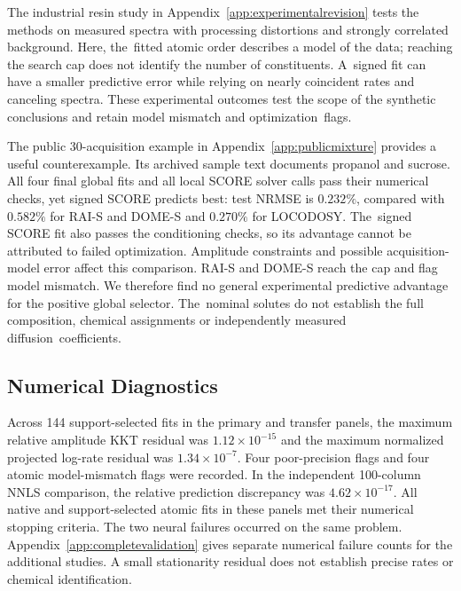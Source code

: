 \documentclass[mathematics,article,accept,moreauthors]{Definitions/mdpi}
\begin{document}
The industrial resin study in Appendix~\ref{app:experimentalrevision} tests the
methods on measured spectra with processing distortions and strongly correlated
background. Here, the~fitted atomic order describes a model of the data; reaching
the search cap does not identify the number of constituents. A~signed fit can
have a smaller predictive error while relying on nearly coincident rates and
canceling spectra. These experimental outcomes test the scope of the synthetic
conclusions and retain model mismatch and optimization~flags.

The public 30-acquisition example in Appendix~\ref{app:publicmixture} provides
a useful counterexample. Its archived sample text documents propanol and sucrose.
All four final global fits and all local SCORE solver calls pass their numerical
checks, yet signed SCORE predicts best: test NRMSE is $0.232\%$, compared with
$0.582\%$ for RAI-S and DOME-S and $0.270\%$ for LOCODOSY. The~signed SCORE fit
also passes the conditioning checks, so its advantage cannot be attributed to
failed optimization. Amplitude constraints and possible acquisition-model error
affect this comparison. RAI-S and DOME-S reach the cap and flag model mismatch.
We therefore find no general experimental predictive advantage for the positive
global selector. The~nominal solutes do not establish the full composition,
chemical assignments or independently measured diffusion~coefficients.

\subsection{Numerical Diagnostics}
Across 144 support-selected fits in the primary and transfer panels, the maximum relative amplitude KKT residual was $1.12\times10^{-15}$ and the maximum normalized projected log-rate residual was $1.34\times10^{-7}$. Four poor-precision flags and four atomic model-mismatch flags were recorded. In the independent 100-column NNLS comparison, the relative prediction discrepancy was $4.62\times10^{-17}$. All native and support-selected atomic fits in these panels met their numerical stopping criteria. The two neural failures occurred on the same problem. Appendix~\ref{app:completevalidation} gives separate numerical failure counts for the additional studies. A small stationarity residual does not establish precise rates or chemical identification.



%
\end{document}
